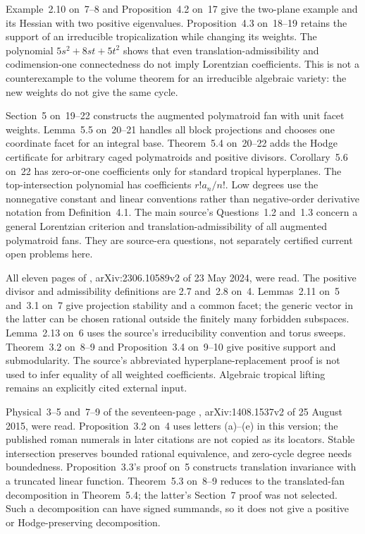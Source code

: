 Example~2.10 on~7--8 and Proposition~4.2 on~17 give
the two-plane example and its Hessian with two positive
eigenvalues. Proposition~4.3 on~18--19 retains the support
of an irreducible tropicalization while changing its weights.
The polynomial $5s^2+8st+5t^2$ shows that even
translation-admissibility and codimension-one connectedness
do not imply Lorentzian coefficients. This is not a
counterexample to the volume theorem for an irreducible
algebraic variety: the new weights do not give the same cycle.

Section~5 on~19--22 constructs the augmented polymatroid
fan with unit facet weights. Lemma~5.5 on~20--21 handles
all block projections and chooses one coordinate facet for
an integral base. Theorem~5.4 on~20--22 adds the Hodge
certificate for arbitrary caged polymatroids and positive
divisors. Corollary~5.6 on~22 has zero-or-one coefficients
only for standard tropical hyperplanes. The top-intersection
polynomial has coefficients $r!a_n/n!$. Low degrees use
the nonnegative constant and linear conventions rather than
negative-order derivative notation from Definition~4.1.
The main source's Questions~1.2 and~1.3 concern a general
Lorentzian criterion and translation-admissibility of all
augmented polymatroid fans. They are source-era questions,
not separately certified current open problems here.

All eleven pages of \cite{He24TropicalMultidegreesV2},
arXiv:2306.10589v2 of 23 May 2024, were read.
The positive divisor and admissibility definitions are
2.7 and~2.8 on~4. Lemmas~2.11 on~5 and~3.1 on~7
give projection stability and a common facet; the generic
vector in the latter can be chosen rational outside the
finitely many forbidden subspaces. Lemma~2.13 on~6
uses the source's irreducibility convention and torus
sweeps. Theorem~3.2 on~8--9 and Proposition~3.4 on~9--10
give positive support and submodularity. The source's
abbreviated hyperplane-replacement proof is not used to
infer equality of all weighted coefficients. Algebraic
tropical lifting remains an explicitly cited external input.

Physical~3--5 and~7--9 of the seventeen-page
\cite{AllermannHampeRau15RationalEquivalenceV2},
arXiv:1408.1537v2 of 25 August 2015, were read.
Proposition~3.2 on~4 uses letters (a)--(e) in this version;
the published roman numerals in later citations are not
copied as its locators. Stable intersection preserves bounded
rational equivalence, and zero-cycle degree needs boundedness.
Proposition~3.3's proof on~5 constructs translation invariance
with a truncated linear function. Theorem~5.3 on~8--9
reduces to the translated-fan decomposition in Theorem~5.4;
the latter's Section~7 proof was not selected. Such a
decomposition can have signed summands, so it does not
give a positive or Hodge-preserving decomposition.

